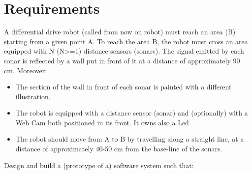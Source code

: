 \documentclass[a4paper]{article}
\begin{document}
\section{Requirements }
A differential drive robot (called from now on robot) must reach an area (B) starting from a given point A. To reach the area B, the robot must cross an area equipped with N (N>=1) distance sensors (sonars). The signal emitted by each sonar is reflected by a wall put in front of it at a distance of approximately 90 cm.
Moreover:
\begin{itemize}
	\item The section of the wall in front of each sonar is painted with a different illustration.
	\item The robot is equipped with a distance sensor (sonar) and (optionally) with a Web Cam both positioned in its front. It owns also a Led
	\item The robot should move from A to B by travelling along a straight line, at a distance of approximately 40-50 cm from the base-line of the sonars.
\end{itemize}
Design and build a (prototype of a) software system such that:
\end{document}
